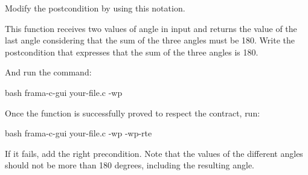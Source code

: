 Modify the postcondition by using this notation.






This function receives two values of angle in input and returns the value
of the last angle considering that the sum of the three angles must be 180.
Write the postcondition that expresses that the sum of the three angles is
180.





And run the command:


\begin{CodeBlock}{bash}
frama-c-gui your-file.c -wp
\end{CodeBlock}


Once the function is successfully proved to respect the contract, run:


\begin{CodeBlock}{bash}
frama-c-gui your-file.c -wp -wp-rte
\end{CodeBlock}



If it fails, add the right precondition. Note that the values of the different
angles should not be more than 180 degrees, including the resulting angle.

